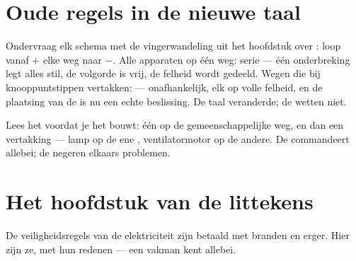 \section{Oude regels in de nieuwe taal}

\begin{example}\label{ex:g6:circuits-and-safety:reading}
Ondervraag elk schema met de vingerwandeling uit het hoofdstuk over
: loop vanaf $+$ elke weg naar $-$. Alle apparaten
op één weg: serie --- één onderbreking legt alles stil, de volgorde is
vrij, de felheid wordt gedeeld. Wegen die bij knooppuntstippen
vertakken:  ---  onafhankelijk, elk op volle felheid, en
de plaatsing van de  is nu een echte beslissing. De taal
veranderde; de wetten niet.
\end{example}

\begin{omfigure}

{\small Lees het voordat je het bouwt: één  op de
gemeenschappelijke weg, en dan een vertakking --- lamp op de ene
, ventilatormotor op de andere. De  commandeert
allebei; de  negeren elkaars problemen.}
\end{omfigure}

\section{Het hoofdstuk van de littekens}

De veiligheidsregels van de elektriciteit zijn betaald met branden en
erger. Hier zijn ze, met hun redenen --- een vakman kent allebei.

